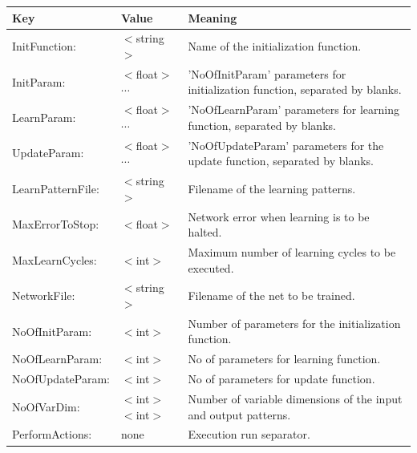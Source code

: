 {\newpage
\clearpage
\samepage \begin{tabular}{|llp{68mm}|}
\hline
Key             &Value          &Meaning\\  \hline \hline

InitFunction:   &$<$string$>$           &Name of the initialization
function.\\ 

InitParam:      &$<$float$>$ $\cdots$ &'NoOfInitParam' pa\-ra\-meters
for in\-i\-tiali\-zation function, separated by blanks.\\ 

LearnParam:     &$<$float$>$ $\cdots$ &'NoOfLearnParam' parameters
for learning function, separated by blanks.\\ 

UpdateParam:    &$<$float$>$ $\cdots$ &'NoOfUpdateParam' parameters
for the update function, separated by blanks.\\ 

LearnPatternFile: &$<$string$>$         &Filename of the learning patterns.\\ 

MaxErrorToStop: &$<$float$>$        &Network error when learning is to
be halted.\\ 

MaxLearnCycles: &$<$int$>$              &Maximum number of learning
cycles to be executed.\\ 

NetworkFile:    &$<$string$>$    &Filename of the net to be trained.\\ 

NoOfInitParam:  &$<$int$>$ &Number of parameters for the initialization
function.\\  

NoOfLearnParam: &$<$int$>$ &No of parameters for learning function.\\ 

NoOfUpdateParam: &$<$int$>$ &No of parameters for update function.\\ 

NoOfVarDim:     &$<$int$>$ $<$int$>$   &Number of variable dimensions of
the input and output patterns.\\ 

PerformActions:         &none &Execution run separator.\\ 
\hline
\end{tabular}
}

